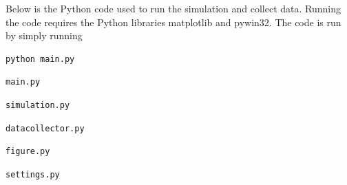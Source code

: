 \documentclass[english, 12pt, a4paper, elec, utf8, pdfa, online]{aaltothesis}
\begin{document}
Below is the Python code used to run the simulation and collect data. Running the code requires the Python libraries matplotlib and pywin32. The code is run by simply running \begin{verbatim}python main.py\end{verbatim}

\begin{verbatim}main.py\end{verbatim}


\begin{verbatim}simulation.py\end{verbatim}


\begin{verbatim}datacollector.py\end{verbatim}


\begin{verbatim}figure.py\end{verbatim}


\begin{verbatim}settings.py\end{verbatim}

\end{document}
